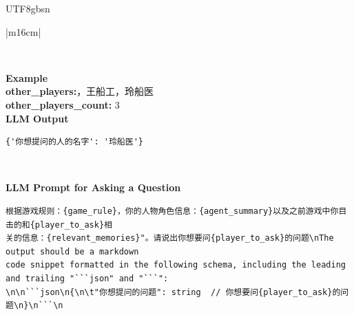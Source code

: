 \documentclass[11pt]{article}
\begin{document}
{\begin{CJK}{UTF8}{gbsn}
\begin{table}[ht!]
\begin{tabular}{|m{16cm}|}
\begin{minipage}[t]{\linewidth}
\begin{verbatim}
\end{verbatim}
\end{minipage} \\
\hline
{}  \textbf{Example}  \\
 \textbf{  other\_players:}，王船工，玲船医\\
 \textbf{  other\_players\_count:} \small3\\
 
\hline
{}  \textbf{LLM Output}  \\
\hline
\begin{minipage}[t]{\linewidth}
\small\begin{verbatim}
{'你想提问的人的名字': '玲船医'}

\end{verbatim}
\end{minipage} \\
\hline



\hline
{}  {\textbf{LLM Prompt for Asking a Question}} \\
\begin{minipage}[t]{\linewidth}
\small\begin{verbatim}
根据游戏规则：{game_rule}，你的人物角色信息：{agent_summary}以及之前游戏中你目击的和{player_to_ask}相
关的信息：{relevant_memories}"。请说出你想要问{player_to_ask}的问题\nThe output should be a markdown 
code snippet formatted in the following schema, including the leading and trailing "```json" and "```":
\n\n```json\n{\n\t"你想提问的问题": string  // 你想要问{player_to_ask}的问题\n}\n```\n


\end{verbatim}
\end{minipage}
\end{tabular}
\end{table}
\end{CJK}}
\end{document}
